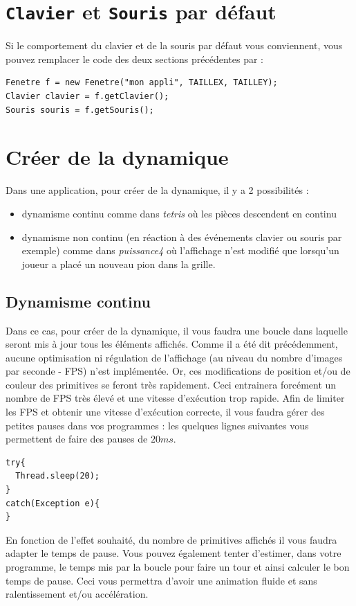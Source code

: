 \documentclass[12pt]{exam}
\begin{document}
\section{\texttt{Clavier} et \texttt{Souris} par défaut}
Si le comportement du clavier et de la souris par défaut vous conviennent, vous pouvez remplacer le code des deux sections précédentes par :
\begin{lstlisting}
Fenetre f = new Fenetre("mon appli", TAILLEX, TAILLEY);
Clavier clavier = f.getClavier();
Souris souris = f.getSouris();
\end{lstlisting}

\section{Créer de la dynamique}
Dans une application, pour créer de la dynamique, il y a 2 possibilités :
\begin{itemize}
\item dynamisme continu comme dans \textit{tetris} où les pièces descendent en continu
\item dynamisme non continu (en réaction à des événements clavier ou souris par exemple) comme dans \textit{puissance4} où l'affichage n'est modifié que lorsqu'un joueur a placé un nouveau pion dans la grille.
\end{itemize}

\subsection{Dynamisme continu}
Dans ce cas, pour créer de la dynamique, il vous faudra une boucle dans laquelle seront mis à jour tous les éléments affichés. Comme il a été dit précédemment, aucune optimisation ni régulation de l'affichage (au niveau du nombre d'images par seconde - FPS) n'est implémentée. Or, ces modifications de position et/ou de couleur des primitives se feront très rapidement. Ceci entrainera forcément un nombre de FPS très élevé et une vitesse d'exécution trop rapide. Afin de limiter les FPS et obtenir une vitesse d'exécution correcte, il vous faudra gérer des petites pauses dans vos programmes : les quelques lignes suivantes vous permettent de faire des pauses de $20ms$.
  
\begin{lstlisting}
try{
  Thread.sleep(20);
}
catch(Exception e){
}
\end{lstlisting}
En fonction de l'effet souhaité, du nombre de primitives affichés il vous faudra adapter le temps de pause. Vous pouvez également tenter d'estimer, dans votre programme, le temps mis par la boucle pour faire un tour et ainsi calculer le bon temps de pause. Ceci vous permettra d'avoir une animation fluide et sans ralentissement et/ou accélération.
\end{document}

